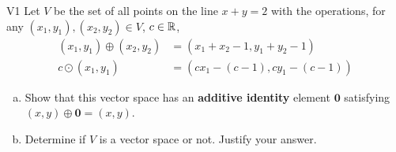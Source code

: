 \documentclass{sbgLAexam}
\begin{document}
\begin{extract}\newpage\end{extract}
\begin{problem}{V1}
Let $V$ be the set of all points on the line $x+y=2$ with the operations, for any $(x_1,y_1), (x_2,y_2) \in V$, $c \in \mathbb{R}$,
\begin{align*}
(x_1,y_1) \oplus (x_2,y_2) &= (x_1+x_2-1,y_1+y_2-1) \\
c \odot (x_1,y_1) &= (cx_1-(c-1), cy_1-(c-1))
\end{align*}
\begin{enumerate}[(a)]
\item Show that this vector space has an \textbf{additive identity} element
      \(\mathbf{0}\) satisfying \((x,y)\oplus\mathbf{0}=(x,y)\).
\item Determine if $V$ is a vector space or not.  Justify your answer.
\end{enumerate}
\end{problem}
\end{document}
